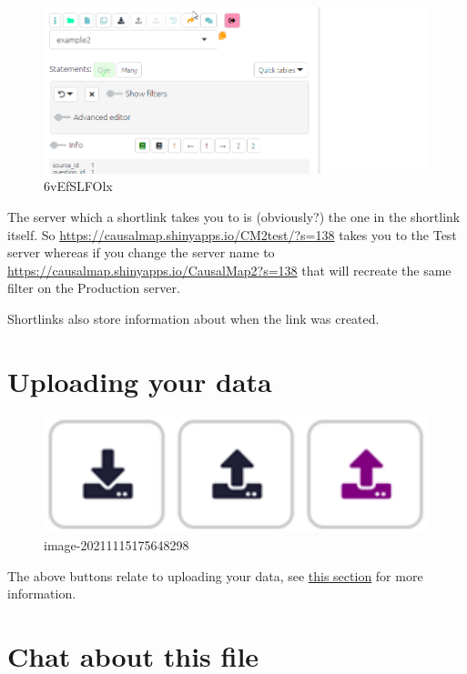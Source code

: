 \documentclass[
]{book}
\begin{document}
\begin{figure}
\centering
\includegraphics[width=6.77083in,height=\textheight]{_assets/6vEfSLFOlx.gif}
\caption{6vEfSLFOlx}
\end{figure}

The server which a shortlink takes you to is (obviously?) the one in the shortlink itself. So \url{https://causalmap.shinyapps.io/CM2test/?s=138} takes you to the Test server whereas if you change the server name to \url{https://causalmap.shinyapps.io/CausalMap2?s=138} that will recreate the same filter on the Production server.

Shortlinks also store information about when the link was created.

\hypertarget{uploading-your-data}{%
\section{Uploading your data}\label{uploading-your-data}}

\begin{figure}
\centering
\includegraphics[width=6.77083in,height=\textheight]{_assets/image-20211115175648298.png}
\caption{image-20211115175648298}
\end{figure}

The above buttons relate to uploading your data, see \protect\hyperlink{xuploading-and-updating}{this section} for more information.

\hypertarget{chat-about-this-file}{%
\section{Chat about this file}\label{chat-about-this-file}}
\end{document}
